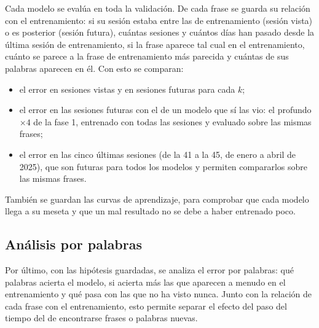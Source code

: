 Cada modelo se evalúa en toda la validación. De cada frase se guarda su relación con el entrenamiento: si su sesión estaba entre las de entrenamiento (sesión vista) o es posterior (sesión futura), cuántas sesiones y cuántos días han pasado desde la última sesión de entrenamiento, si la frase aparece tal cual en el entrenamiento, cuánto se parece a la frase de entrenamiento más parecida y cuántas de sus palabras aparecen en él. Con esto se comparan:

\begin{itemize}[leftmargin=*, itemsep=0.3em]
  \item el error en sesiones vistas y en sesiones futuras para cada $k$;
  \item el error en las sesiones futuras con el de un modelo que sí las vio: el profundo $\times 4$ de la fase 1, entrenado con todas las sesiones y evaluado sobre las mismas frases;
  \item el error en las cinco últimas sesiones (de la 41 a la 45, de enero a abril de 2025), que son futuras para todos los modelos y permiten compararlos sobre las mismas frases.
\end{itemize}

También se guardan las curvas de aprendizaje, para comprobar que cada modelo llega a su meseta y que un mal resultado no se debe a haber entrenado poco.

\subsection{Análisis por palabras}

Por último, con las hipótesis guardadas, se analiza el error por palabras: qué palabras acierta el modelo, si acierta más las que aparecen a menudo en el entrenamiento y qué pasa con las que no ha visto nunca. Junto con la relación de cada frase con el entrenamiento, esto permite separar el efecto del paso del tiempo del de encontrarse frases o palabras nuevas.
